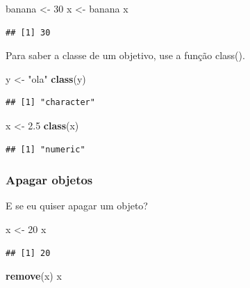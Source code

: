 \documentclass[
]{book}
\newenvironment{Shaded}{\begin{snugshade}}{\end{snugshade}}
\newcommand{\DecValTok}[1]{\textcolor[rgb]{0.00,0.00,0.81}{#1}}
\newcommand{\FloatTok}[1]{\textcolor[rgb]{0.00,0.00,0.81}{#1}}
\newcommand{\KeywordTok}[1]{\textcolor[rgb]{0.13,0.29,0.53}{\textbf{#1}}}
\newcommand{\NormalTok}[1]{#1}
\newcommand{\StringTok}[1]{\textcolor[rgb]{0.31,0.60,0.02}{#1}}
\begin{document}
\begin{Shaded}
\begin{Highlighting}[]
\NormalTok{banana <-}\StringTok{ }\DecValTok{30}
\NormalTok{x <-}\StringTok{ }\NormalTok{banana}
\NormalTok{x}
\end{Highlighting}
\end{Shaded}

\begin{verbatim}
## [1] 30
\end{verbatim}

Para saber a classe de um objetivo, use a função class().

\begin{Shaded}
\begin{Highlighting}[]
\NormalTok{y <-}\StringTok{ "ola"}
\KeywordTok{class}\NormalTok{(y)}
\end{Highlighting}
\end{Shaded}

\begin{verbatim}
## [1] "character"
\end{verbatim}

\begin{Shaded}
\begin{Highlighting}[]
\NormalTok{x <-}\StringTok{ }\FloatTok{2.5}
\KeywordTok{class}\NormalTok{(x)}
\end{Highlighting}
\end{Shaded}

\begin{verbatim}
## [1] "numeric"
\end{verbatim}

\hypertarget{apagar-objetos}{%
\subsubsection{Apagar objetos}\label{apagar-objetos}}

E se eu quiser apagar um objeto?

\begin{Shaded}
\begin{Highlighting}[]
\NormalTok{x <-}\StringTok{ }\DecValTok{20}
\NormalTok{x}
\end{Highlighting}
\end{Shaded}

\begin{verbatim}
## [1] 20
\end{verbatim}

\begin{Shaded}
\begin{Highlighting}[]
\KeywordTok{remove}\NormalTok{(x)}
\NormalTok{x}
\end{Highlighting}
\end{Shaded}
\end{document}

